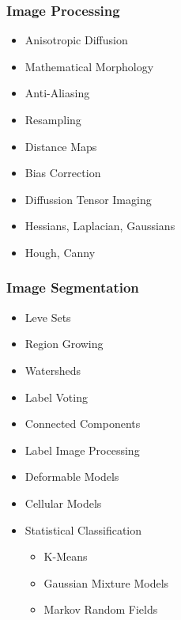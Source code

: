 \begin{frame}
\frametitle{Image Processing}
\begin{itemize}
\item Anisotropic Diffusion
\pause
\item Mathematical Morphology
\pause
\item Anti-Aliasing
\pause
\item Resampling
\pause
\item Distance Maps
\pause
\item Bias Correction
\pause
\item Diffussion Tensor Imaging
\pause
\item Hessians, Laplacian, Gaussians
\pause
\item Hough, Canny
\end{itemize}
\end{frame}

\begin{frame}
\frametitle{Image Segmentation}
\begin{itemize}
\item Leve Sets
\pause
\item Region Growing
\pause
\item Watersheds
\pause
\item Label Voting
\pause
\item Connected Components
\pause
\item Label Image Processing
\pause
\item Deformable Models
\pause
\item Cellular Models
\pause
\item Statistical Classification
\begin{itemize}
\item K-Means
\item Gaussian Mixture Models
\item Markov Random Fields
\end{itemize}
\end{itemize}
\end{frame}

